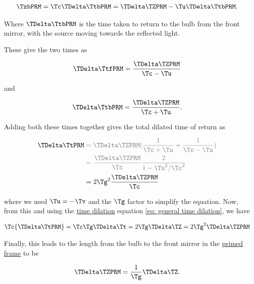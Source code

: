 \begin{equation}
	{\TzbPRM } = {\Tc } {\TDelta  \TtbPRM } = {\TDelta   \TZPRM } - {\Tu } {\TDelta  \TtbPRM }.
\end{equation}

Where ${\TDelta  \TtbPRM }$ is the time taken to return to the bulb from the front mirror, with the source moving towards the reflected light.

These give the two times as

\begin{equation}
	{\TDelta  \TtfPRM } = \frac{\TDelta   \TZPRM }{ \Tc  - \Tu  }
\end{equation}

and

\begin{equation}
	{\TDelta  \TtbPRM } = \frac{ \TDelta   \TZPRM  }{ \Tc  + \Tu  }.
\end{equation}

Adding both these times together gives the total dilated time of return as

\begin{equation}
	\begin{aligned}
		{\TDelta  \TtPRM  } & \color{gray} = {\TDelta   \TZPRM }(\frac{1}{ \Tc  + \Tu  } + \frac{1}{ \Tc  - \Tu  }) \\
		              & \color{gray} = \frac{\TDelta   \TZPRM }{\Tc }\frac{2}{1- \Tu ^2/\Tc ^2}            \\
		              & =  2 \Tg ^2 \frac{\TDelta   \TZPRM }{\Tc }
	\end{aligned}
\end{equation}

where we used ${\Tu }=-{\Tv }$ and the ${\Tg }$ factor to simplify the equation.
Now, from this and using the \hyperlink{def-time-dilation}{time dilation} equation \eqref{eq: general time dilation}, we have


\begin{equation}
	\Tc {\TDelta  \TtPRM  } = {\Tc }{\Tg } {\TDelta  \Tt } = 2{\Tg } {\TDelta  \TZ } = 2{\Tg }^2 {\TDelta   \TZPRM }
\end{equation}

Finally, this leads to the length from the bulb to the front mirror in the \hyperlink{def-Primed-Frame}{primed frame} to be

\begin{equation}
	{\TDelta   \TZPRM } = \frac{1}{ \Tg  }{\TDelta   \TZ }.
\end{equation}

